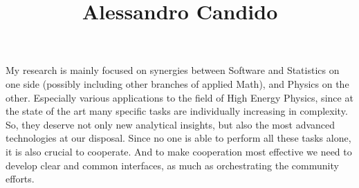 \documentclass[10pt, a4paper, sans]{moderncv}
\title{Alessandro Candido}
\begin{document}
\makecvtitle
\vspace*{-2em}

\fancyfoot[RF]{}

My research is mainly focused on synergies between Software and Statistics on
one side (possibly including other branches of applied Math), and Physics on
the other. 
Especially various applications to the field of High Energy Physics, since at
the state of the art many specific tasks are individually increasing in
complexity. So, they deserve not only new analytical insights, but also the
most advanced technologies at our disposal.
Since no one is able to perform all these tasks alone, it is also crucial to
cooperate.
And to make cooperation most effective we need to develop clear and common
interfaces, as much as orchestrating the community efforts.

\begin{multicols}{2}


\columnbreak



\end{multicols}
\end{document}

